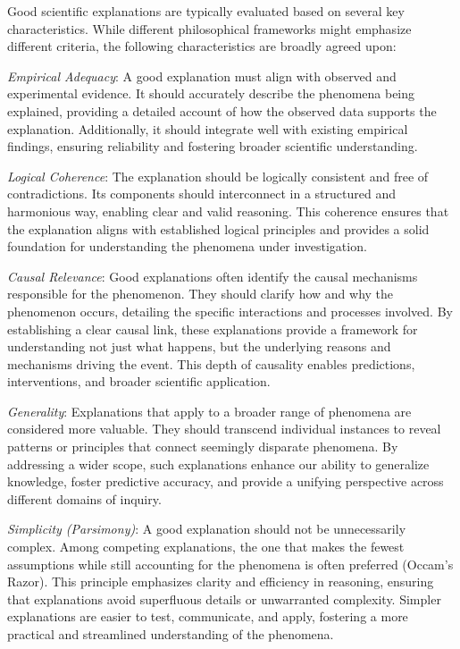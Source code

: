Good scientific explanations are typically evaluated based on several key characteristics. While different philosophical frameworks might emphasize different criteria, the following characteristics are broadly agreed upon:

\emph{Empirical Adequacy}: A good explanation must align with observed and experimental evidence. It should accurately describe the phenomena being explained, providing a detailed account of how the observed data supports the explanation. Additionally, it should integrate well with existing empirical findings, ensuring reliability and fostering broader scientific understanding.

\emph{Logical Coherence}: The explanation should be logically consistent and free of contradictions. Its components should interconnect in a structured and harmonious way, enabling clear and valid reasoning. This coherence ensures that the explanation aligns with established logical principles and provides a solid foundation for understanding the phenomena under investigation.

\emph{Causal Relevance}: Good explanations often identify the causal mechanisms responsible for the phenomenon. They should clarify how and why the phenomenon occurs, detailing the specific interactions and processes involved. By establishing a clear causal link, these explanations provide a framework for understanding not just what happens, but the underlying reasons and mechanisms driving the event. This depth of causality enables predictions, interventions, and broader scientific application.

\emph{Generality}: Explanations that apply to a broader range of phenomena are considered more valuable. They should transcend individual instances to reveal patterns or principles that connect seemingly disparate phenomena. By addressing a wider scope, such explanations enhance our ability to generalize knowledge, foster predictive accuracy, and provide a unifying perspective across different domains of inquiry.

\emph{Simplicity (Parsimony)}: A good explanation should not be unnecessarily complex. Among competing explanations, the one that makes the fewest assumptions while still accounting for the phenomena is often preferred (Occam’s Razor). This principle emphasizes clarity and efficiency in reasoning, ensuring that explanations avoid superfluous details or unwarranted complexity. Simpler explanations are easier to test, communicate, and apply, fostering a more practical and streamlined understanding of the phenomena.

